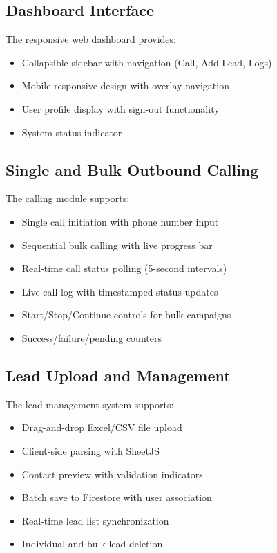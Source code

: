 \documentclass[12pt,a4paper,oneside]{book}
\begin{document}
\subsection{Dashboard Interface}

The responsive web dashboard provides:
\begin{itemize}
    \item Collapsible sidebar with navigation (Call, Add Lead, Logs)
    \item Mobile-responsive design with overlay navigation
    \item User profile display with sign-out functionality
    \item System status indicator
\end{itemize}

\subsection{Single and Bulk Outbound Calling}

The calling module supports:
\begin{itemize}
    \item Single call initiation with phone number input
    \item Sequential bulk calling with live progress bar
    \item Real-time call status polling (5-second intervals)
    \item Live call log with timestamped status updates
    \item Start/Stop/Continue controls for bulk campaigns
    \item Success/failure/pending counters
\end{itemize}

\subsection{Lead Upload and Management}

The lead management system supports:
\begin{itemize}
    \item Drag-and-drop Excel/CSV file upload
    \item Client-side parsing with SheetJS
    \item Contact preview with validation indicators
    \item Batch save to Firestore with user association
    \item Real-time lead list synchronization
    \item Individual and bulk lead deletion
\end{itemize}
\end{document}
